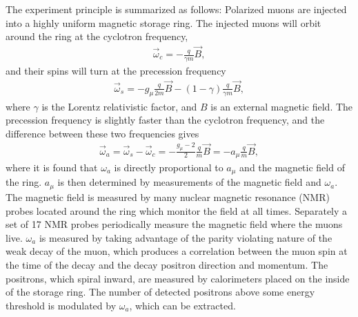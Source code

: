\documentclass[12pt,letterpaper]{article}
\def\wa{$\omega_{a}$\xspace}
\def\amu{$a_{\mu}$\xspace}
\begin{document}


The experiment principle is summarized as follows: Polarized muons are injected into a highly uniform magnetic storage ring. The injected muons will orbit around the ring at the cyclotron frequency,
        \begin{align} \label{eq:wc}
            \vec{\omega}_{c} = -\frac{q}{\gamma m}\vec{B},
        \end{align} 
and their spins will turn at the precession frequency
        \begin{align} \label{eq:ws}
            \vec{\omega}_{s} = -g_{\mu}\frac{q}{2m}\vec{B} - (1-\gamma)\frac{q}{\gamma m}\vec{B},
        \end{align}
where $\gamma$ is the Lorentz relativistic factor, and $B$ is an external magnetic field. The precession frequency is slightly faster than the cyclotron frequency, and the difference between these two frequencies gives 
        \begin{align} \label{eq:wasimple}
            \vec{\omega}_{a} = \vec{\omega}_{s} - \vec{\omega}_{c} = -\frac{g_{\mu}-2}{2}\frac{q}{m}\vec{B} = - a_{\mu} \frac{q}{m}\vec{B},
        \end{align}
where it is found that \wa is directly proportional to \amu and the magnetic field of the ring. \amu is then determined by measurements of the magnetic field and \wa. The magnetic field is measured by many nuclear magnetic resonance (NMR) probes located around the ring which monitor the field at all times. Separately a set of 17 NMR probes periodically measure the magnetic field where the muons live. \wa is measured by taking advantage of the parity violating nature of the weak decay of the muon, which produces a correlation between the muon spin at the time of the decay and the decay positron direction and momentum. The positrons, which spiral inward, are measured by calorimeters placed on the inside of the storage ring. The number of detected positrons above some energy threshold is modulated by \wa, which can be extracted.
\end{document}
